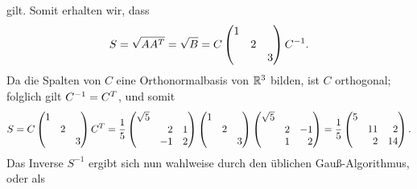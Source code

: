 gilt.
Somit erhalten wir, dass
\[
    S
  = \sqrt{A A^T}
  = \sqrt{B}
  = C
    \begin{pmatrix}
      1 &   &   \\
        & 2 &   \\
        &   & 3
    \end{pmatrix}
    C^{-1}.
\]
Da die Spalten von $C$ eine Orthonormalbasis von $\mathbb{R}^3$ bilden, ist $C$ orthogonal;
folglich gilt $C^{-1} = C^T$, und somit
\[
    S
  = C
    \begin{pmatrix}
      1 &   &   \\
        & 2 &   \\
        &   & 3
    \end{pmatrix}
    \transpose{C}
  = \frac{1}{5}
    \begin{pmatrix*}[r]
      \sqrt{5}  &     &   \\
                &  2  & 1 \\
                & -1  & 2
    \end{pmatrix*}
    \begin{pmatrix}
      1 &   &   \\
        & 2 &   \\
        &   & 3
    \end{pmatrix}
    \begin{pmatrix*}[r]
      \sqrt{5}  &     &     \\
                &  2  & -1  \\
                &  1  &  2
    \end{pmatrix*}
  = \frac{1}{5}
    \begin{pmatrix*}[r]
      5 &     &     \\
        & 11  &  2  \\
        &  2  & 14
    \end{pmatrix*}.
\]
Das Inverse $S^{-1}$ ergibt sich nun wahlweise durch den üblichen Gauß-Algorithmus, oder als
